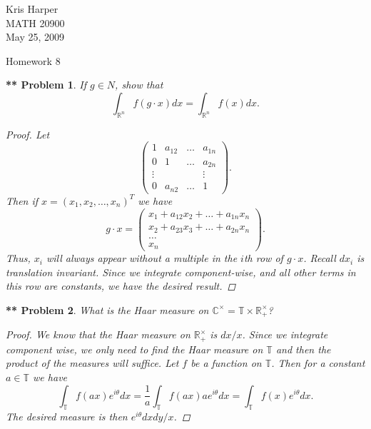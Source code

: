 \documentclass{article}
\newtheorem{**}{** Problem}
\begin{document}
\begin{flushright}
Kris Harper\\

MATH 20900\\

May 25, 2009
\end{flushright}

\begin{center}
Homework 8
\end{center}

\begin{**}
If $g \in N$, show that
\[
\int_{\mathbb{R}^n} f(g \cdot x) dx = \int_{\mathbb{R}^n} f(x) dx.
\]
\begin{proof}
Let
\[
\left (
\begin{array}{cccc}
1 & a_{12} & \dots & a_{1n}\\
0 & 1 & \dots & a_{2n}\\
\vdots &&& \vdots\\
0 & a_{n2} & \dots & 1
\end{array}
\right ).
\]
Then if $x = (x_1, x_2, \dots , x_n)^T$ we have
\[
g \cdot x=
\left (
\begin{array}{c}
x_1 + a_{12} x_2 + \dots + a_{1n} x_n\\
x_2 + a_{23} x_3 + \dots + a_{2n} x_n\\
\dots \\
x_n
\end{array}
\right ).
\]
Thus, $x_i$ will always appear without a multiple in the $i$th row of $g \cdot x$. Recall $dx_i$ is translation invariant. Since we integrate component-wise, and all other terms in this row are constants, we have the desired result.
\end{proof}
\end{**}

\begin{**}
What is the Haar measure on $\mathbb{C}^{\times} = \mathbb{T} \times \mathbb{R}_+^{\times}$?
\begin{proof}
We know that the Haar measure on $\mathbb{R}_+^{\times}$ is $dx/x$. Since we integrate component wise, we only need to find the Haar measure on $\mathbb{T}$ and then the product of the measures will suffice. Let $f$ be a function on $\mathbb{T}$. Then for a constant $a \in \mathbb{T}$ we have
\[
\int_{\mathbb{T}} f(ax) e^{i \theta} dx = \frac{1}{a} \int_{\mathbb{T}} f(ax) a e^{i \theta} dx = \int_{\mathbb{T}} f(x) e^{i \theta} dx.
\]
The desired measure is then $e^{i \theta} dxdy/x$.
\end{proof}
\end{**}
\end{document}
